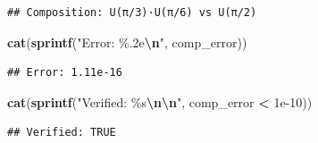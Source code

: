 \documentclass[
]{book}
\newenvironment{Shaded}{\begin{snugshade}}{\end{snugshade}}
\newcommand{\FloatTok}[1]{\textcolor[rgb]{0.00,0.00,0.81}{#1}}
\newcommand{\FunctionTok}[1]{\textcolor[rgb]{0.13,0.29,0.53}{\textbf{#1}}}
\newcommand{\NormalTok}[1]{#1}
\newcommand{\SpecialCharTok}[1]{\textcolor[rgb]{0.81,0.36,0.00}{\textbf{#1}}}
\newcommand{\StringTok}[1]{\textcolor[rgb]{0.31,0.60,0.02}{#1}}
\theoremstyle{definition}
\theoremstyle{definition}
\theoremstyle{definition}
\theoremstyle{definition}
\theoremstyle{remark}
\begin{document}
\begin{verbatim}
## Composition: U(π/3)·U(π/6) vs U(π/2)
\end{verbatim}

\begin{Shaded}
\begin{Highlighting}[]
\FunctionTok{cat}\NormalTok{(}\FunctionTok{sprintf}\NormalTok{(}\StringTok{"Error: \%.2e}\SpecialCharTok{\textbackslash{}n}\StringTok{"}\NormalTok{, comp\_error))}
\end{Highlighting}
\end{Shaded}

\begin{verbatim}
## Error: 1.11e-16
\end{verbatim}

\begin{Shaded}
\begin{Highlighting}[]
\FunctionTok{cat}\NormalTok{(}\FunctionTok{sprintf}\NormalTok{(}\StringTok{"Verified: \%s}\SpecialCharTok{\textbackslash{}n\textbackslash{}n}\StringTok{"}\NormalTok{, comp\_error }\SpecialCharTok{\textless{}} \FloatTok{1e{-}10}\NormalTok{))}
\end{Highlighting}
\end{Shaded}

\begin{verbatim}
## Verified: TRUE
\end{verbatim}
\end{document}
